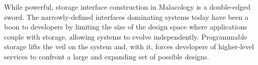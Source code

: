 While powerful, storage interface construction in Malacology is a double-edged
sword. The narrowly-defined interfaces dominating systems today have been a
boon to developers by limiting the size of the design space where applications
couple with storage, allowing systems to evolve independently. Programmable
storage lifts the veil on the system and, with it, forces developers of
higher-level services to confront a large and expanding set of possible
designs.
